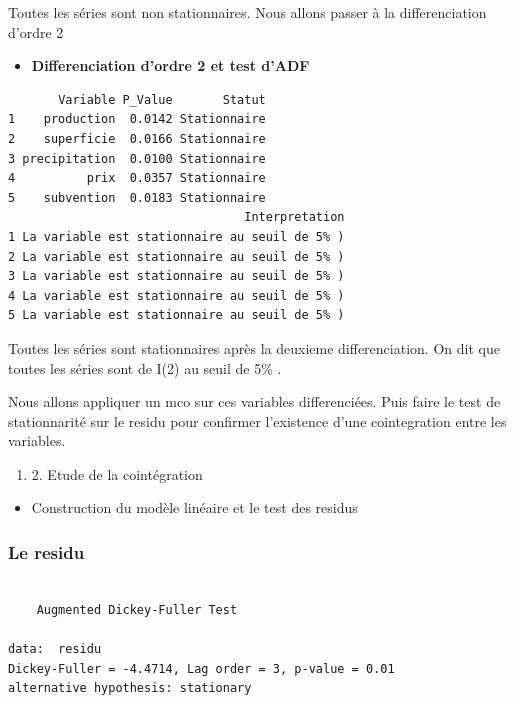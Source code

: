 \documentclass[
  letterpaper,
  DIV=11,
  numbers=noendperiod]{scrartcl}
\providecommand{\tightlist}{%
  \setlength{\itemsep}{0pt}\setlength{\parskip}{0pt}}\usepackage{longtable,booktabs,array}
\begin{document}
\begin{enumerate}
  Toutes les séries sont non stationnaires. Nous allons passer à la
  differenciation d'ordre 2

  \begin{itemize}
  \tightlist
  \item
    \textbf{Differenciation d'ordre 2 et test d'ADF}
  \end{itemize}

\begin{verbatim}
       Variable P_Value       Statut
1    production  0.0142 Stationnaire
2    superficie  0.0166 Stationnaire
3 precipitation  0.0100 Stationnaire
4          prix  0.0357 Stationnaire
5    subvention  0.0183 Stationnaire
                                 Interpretation
1 La variable est stationnaire au seuil de 5% )
2 La variable est stationnaire au seuil de 5% )
3 La variable est stationnaire au seuil de 5% )
4 La variable est stationnaire au seuil de 5% )
5 La variable est stationnaire au seuil de 5% )
\end{verbatim}

  Toutes les séries sont stationnaires après la deuxieme
  differenciation. On dit que toutes les séries sont de I(2) au seuil de
  5\% .
\end{enumerate}

Nous allons appliquer un mco sur ces variables differenciées. Puis faire
le test de stationnarité sur le residu pour confirmer l'existence d'une
cointegration entre les variables.

\begin{enumerate}
\def\labelenumi{\arabic{enumi}.}
\setcounter{enumi}{1}
\tightlist
\item
  2. Etude de la cointégration
\end{enumerate}

\begin{itemize}
\tightlist
\item
  Construction du modèle linéaire et le test des residus
\end{itemize}

\subsubsection{Le residu}\label{le-residu}

\begin{verbatim}

    Augmented Dickey-Fuller Test

data:  residu
Dickey-Fuller = -4.4714, Lag order = 3, p-value = 0.01
alternative hypothesis: stationary
\end{verbatim}
\end{document}
